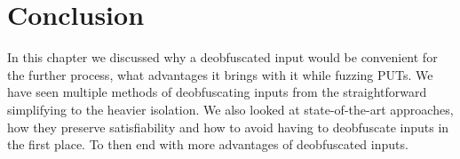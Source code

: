 \section{Conclusion}
\label{inputReduction:Conclusion}
In this chapter we discussed why a deobfuscated input would be convenient for the further process, what advantages it brings with it while fuzzing PUTs. We have seen multiple methods of deobfuscating inputs from the straightforward simplifying to the heavier isolation. We also looked at state-of-the-art approaches, how they preserve satisfiability and how to avoid having to deobfuscate inputs in the first place. To then end with more advantages of deobfuscated inputs.

